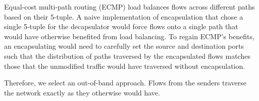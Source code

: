  Equal-cost multi-path routing (ECMP) load balances flows across different paths based on their 5-tuple. 
A naive implementation of encapsulation that chose a single 5-tuple for the decapsulator would force flows onto a single path that would have otherwise benefited from load balancing. 
To regain ECMP's benefits, an encapsulating \name would need to carefully set the source and destination ports such that the distribution of paths traversed by the encapsulated flows matches those that the unmodified traffic would have traversed without encapsulation. 

Therefore, we select an out-of-band approach. Flows from the senders traverse the network exactly as they otherwise would have.
